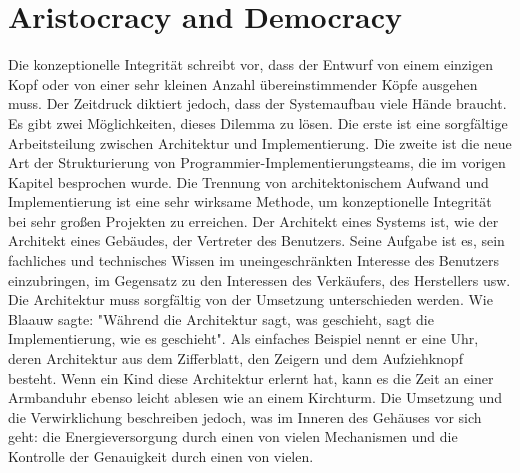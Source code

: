 \documentclass[a4paper, ngerman, 12pt, usenames, dvipsnames]{article}
\begin{document}
 \section{Aristocracy and Democracy}
Die konzeptionelle Integrität schreibt vor, dass der Entwurf von einem einzigen Kopf oder von einer sehr kleinen Anzahl übereinstimmender Köpfe ausgehen muss.
Der Zeitdruck diktiert jedoch, dass der Systemaufbau viele Hände braucht. Es gibt zwei Möglichkeiten, dieses Dilemma zu lösen. Die erste ist eine sorgfältige Arbeitsteilung zwischen Architektur und Implementierung. Die zweite ist die neue Art der Strukturierung von Programmier-Implementierungsteams, die im vorigen Kapitel besprochen wurde.
Die Trennung von architektonischem Aufwand und Implementierung ist eine sehr wirksame Methode, um konzeptionelle Integrität bei sehr großen Projekten zu erreichen.
Der Architekt eines Systems ist, wie der Architekt eines Gebäudes, der Vertreter des Benutzers. Seine Aufgabe ist es, sein fachliches und technisches Wissen im uneingeschränkten Interesse des Benutzers einzubringen, im Gegensatz zu den Interessen des Verkäufers, des Herstellers usw. Die Architektur muss sorgfältig von der Umsetzung unterschieden werden. Wie Blaauw sagte: "Während die Architektur sagt, was geschieht, sagt die Implementierung, wie es geschieht". Als einfaches Beispiel nennt er eine Uhr, deren Architektur aus dem Zifferblatt, den Zeigern und dem Aufziehknopf besteht. Wenn ein Kind diese Architektur erlernt hat, kann es die Zeit an einer Armbanduhr ebenso leicht ablesen wie an einem Kirchturm. Die Umsetzung und die Verwirklichung beschreiben jedoch, was im Inneren des Gehäuses vor sich geht: die Energieversorgung durch einen von vielen Mechanismen und die Kontrolle der Genauigkeit durch einen von vielen.
\end{document}
